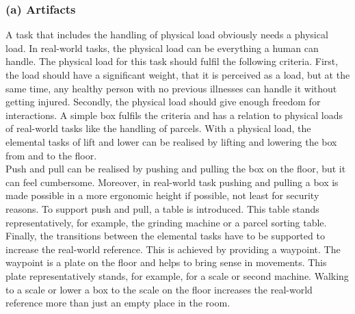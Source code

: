 \subsubsection{(a) Artifacts}
A task that includes the handling of physical load obviously needs a physical load. In real-world tasks, the physical load can be everything a human can handle. The physical load for this task should fulfil the following criteria. First, the load should have a significant weight, that it is perceived as a load, but at the same time, any healthy person with no previous illnesses can handle it without getting injured. Secondly, the physical load should give enough freedom for interactions. A simple box fulfils the criteria and has a relation to physical loads of real-world tasks like the handling of parcels. With a physical load, the elemental tasks of lift and lower can be realised by lifting and lowering the box from and to the floor.\\
Push and pull can be realised by pushing and pulling the box on the floor, but it can feel cumbersome. Moreover, in real-world task pushing and pulling a box is made possible in a more ergonomic height if possible, not least for security reasons. To support push and pull, a table is introduced. This table stands representatively, for example, the grinding machine or a parcel sorting table.\\
Finally, the transitions between the elemental tasks have to be supported to increase the real-world reference. This is achieved by providing a waypoint. The waypoint is a plate on the floor and helps to bring sense in movements. This plate representatively stands, for example, for a scale or second machine. Walking to a scale or lower a box to the scale on the floor increases the real-world reference more than just an empty place in the room.

